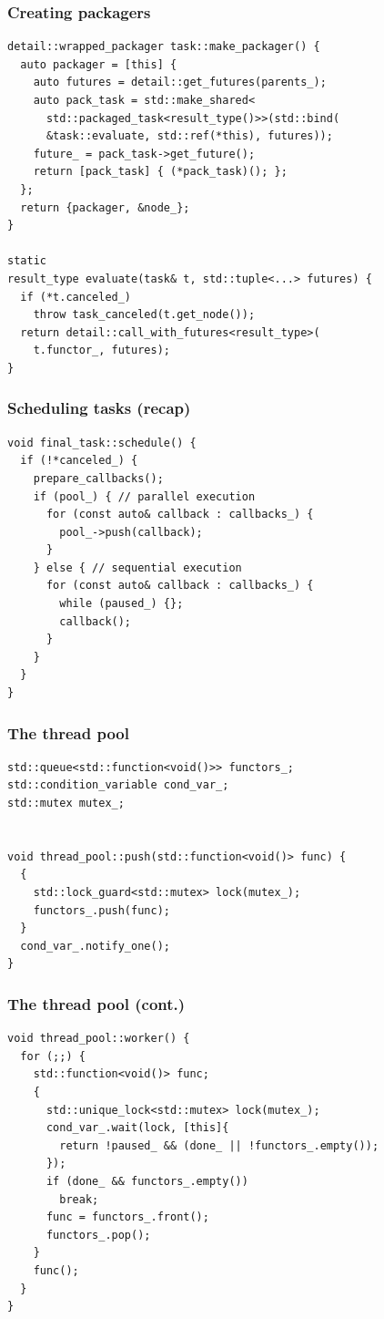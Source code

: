 \documentclass[11pt]{beamer}
\begin{document}
\begin{frame}[fragile]
\frametitle{Creating packagers}
\begin{lstlisting}
detail::wrapped_packager task::make_packager() {
  auto packager = [this] {
    auto futures = detail::get_futures(parents_);
    auto pack_task = std::make_shared<
      std::packaged_task<result_type()>>(std::bind(
      &task::evaluate, std::ref(*this), futures));
    future_ = pack_task->get_future();
    return [pack_task] { (*pack_task)(); };
  };
  return {packager, &node_};
}

static
result_type evaluate(task& t, std::tuple<...> futures) {
  if (*t.canceled_)
    throw task_canceled(t.get_node());
  return detail::call_with_futures<result_type>(
    t.functor_, futures);
}
\end{lstlisting}
\end{frame}


\begin{frame}[fragile]
\frametitle{Scheduling tasks (recap)}
\begin{lstlisting}
void final_task::schedule() {
  if (!*canceled_) {
    prepare_callbacks();
    if (pool_) { // parallel execution
      for (const auto& callback : callbacks_) {
        pool_->push(callback);
      }
    } else { // sequential execution
      for (const auto& callback : callbacks_) {
        while (paused_) {};
        callback();
      }
    }
  }
}
\end{lstlisting}
\end{frame}


\begin{frame}[fragile]
\frametitle{The thread pool}
\begin{lstlisting}
std::queue<std::function<void()>> functors_;
std::condition_variable cond_var_;
std::mutex mutex_;


void thread_pool::push(std::function<void()> func) {
  {
    std::lock_guard<std::mutex> lock(mutex_);
    functors_.push(func);
  }
  cond_var_.notify_one();
}
\end{lstlisting}
\end{frame}


\begin{frame}[fragile]
\frametitle{The thread pool (cont.)}
\begin{lstlisting}
void thread_pool::worker() {
  for (;;) {
    std::function<void()> func;
    {
      std::unique_lock<std::mutex> lock(mutex_);
      cond_var_.wait(lock, [this]{
        return !paused_ && (done_ || !functors_.empty());
      });
      if (done_ && functors_.empty())
        break;
      func = functors_.front();
      functors_.pop();
    }
    func();
  }
}
\end{lstlisting}
\end{frame}
\end{document}
